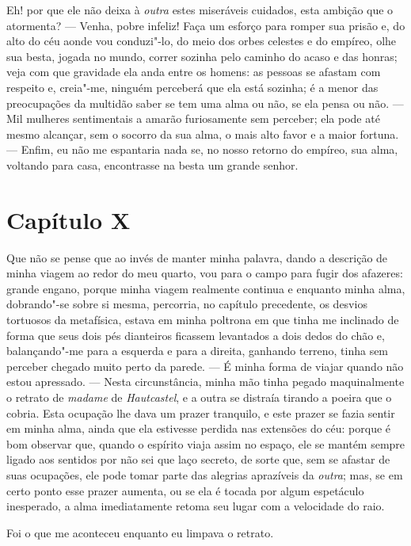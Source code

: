  Eh! por que ele não deixa à \textit{outra} estes miseráveis cuidados,
esta ambição que o atormenta? --- Venha, pobre infeliz! Faça um esforço
para romper sua prisão e, do alto do céu aonde vou conduzi"-lo, do meio
dos orbes celestes e do empíreo, olhe sua besta, jogada no mundo,
correr sozinha pelo caminho do acaso e das honras; veja com que
gravidade ela anda entre os homens: as pessoas se afastam com respeito
e, creia"-me, ninguém perceberá que ela está sozinha; é a menor das
preocupações da multidão saber se tem uma alma ou não, se ela pensa ou
não. --- Mil mulheres sentimentais a amarão furiosamente sem perceber;
ela pode até mesmo alcançar, sem o socorro da sua alma, o mais alto
favor e a maior fortuna. --- Enfim, eu não me espantaria nada se, no
nosso retorno do empíreo, sua alma, voltando para casa, encontrasse na
besta um grande senhor. 

\section*{Capítulo X}

 Que não se pense que ao invés de manter minha palavra, dando a
descrição de minha viagem ao redor do meu quarto, vou para o campo para
fugir dos afazeres: grande engano, porque minha viagem realmente
continua e enquanto minha alma, dobrando"-se sobre si mesma, percorria,
no capítulo precedente, os desvios tortuosos da metafísica, estava em
minha poltrona em que tinha me inclinado de forma que seus dois pés
dianteiros ficassem levantados a dois dedos do chão e, balançando"-me
para a esquerda e para a direita, ganhando terreno, tinha sem perceber
chegado muito perto da parede. --- É minha forma de viajar quando não
estou apressado. --- Nesta circunstância, minha mão tinha pegado
maquinalmente o retrato de \textit{madame} de \textit{Hautcastel}, e a
outra se distraía tirando a poeira que o cobria. Esta ocupação lhe dava
um prazer tranquilo, e este prazer se fazia sentir em minha alma, ainda
que ela estivesse perdida nas extensões do céu: porque é bom observar
que, quando o espírito viaja assim no espaço, ele se mantém sempre
ligado aos sentidos por não sei que laço secreto, de sorte que, sem se
afastar de suas ocupações, ele pode tomar parte das alegrias aprazíveis
da \textit{outra}; mas, se em certo ponto esse prazer aumenta, ou se
ela é tocada por algum espetáculo inesperado, a alma imediatamente
retoma seu lugar com a velocidade do raio. 

 Foi o que me aconteceu enquanto eu limpava o retrato.

